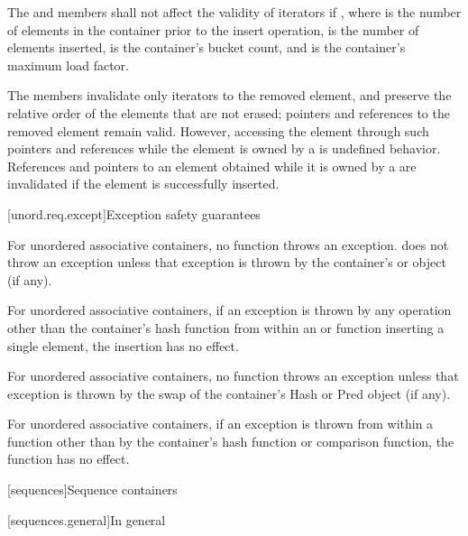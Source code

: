 \pnum
{}%
%
The  and  members shall not affect the validity of iterators if
, where  is the number of elements in
the container prior to the insert operation,  is the
number of elements inserted,  is the container's bucket count, and
 is the container's maximum load factor.

\pnum
The  members invalidate only iterators to the removed element,
and preserve the relative order of the elements that are not erased; pointers
and references to the removed element remain valid. However, accessing the
element through such pointers and references while the element is owned by a
 is undefined behavior. References and pointers to an element
obtained while it is owned by a  are invalidated if the
element is successfully inserted.

[unord.req.except]{Exception safety guarantees}

\pnum
{}%
%
For unordered associative containers, no  function
throws an exception.  does not throw an
exception unless that exception is thrown by the container's  or
 object (if any).

\pnum
For unordered associative containers, if an exception is thrown by any
operation other than the container's hash function from within an
 or  function inserting a single element,
the insertion has no effect.

\pnum
For unordered associative containers, no  function throws
an exception unless that exception is thrown by the swap of the container's
Hash or Pred object (if any).

\pnum
{}%
%
For unordered associative containers, if an exception is thrown
from within a  function other than by the container's hash
function or comparison function, the  function has no effect.

[sequences]{Sequence containers}

[sequences.general]{In general}


